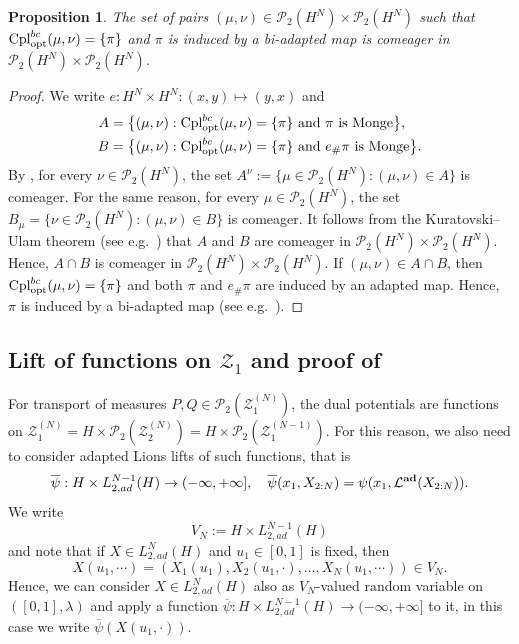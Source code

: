 \documentclass[a4paper]{amsart}
\numberwithin{theorem}{section}
\newtheorem{proposition}[theorem]{Proposition}
\theoremstyle{definition}
\newcommand{\law}{\mathcal{L}}
\newcommand{\cpl}{\textup{Cpl}}
\newcommand{\Pc}{\mathcal P}
\newcommand{\cplopt}{\cpl_{\rm opt}}
\renewcommand{\H}{H}
\newcommand{\Zc}{\mathcal{Z}}
\newcommand{\lawadd}{\law^{\textnormal{\textbf{ad}}}}
\begin{document}
\begin{proposition}\label{prop:biMongeGd_proc}
 The set of pairs $(\mu,\nu) \in \Pc_2(\H^N) \times \Pc_2(\H^N) $  such that  $\cplopt^{bc}(\mu,\nu) = \{\pi\}$ and $\pi$ is induced by a bi-adapted map is  comeager in $\Pc_2(\H^N) \times \Pc_2(\H^N)$.
\end{proposition}
\begin{proof}
 We write $e : \H^N \times \H^N : (x,y) \mapsto (y,x)$ and 
\begin{align*}
    A &= \big\{  (\mu,\nu) : \cplopt^{bc}(\mu,\nu) = \{\pi\}  \text{ and $\pi$ is Monge}  \big\}, \\
    B &= \big\{  (\mu,\nu) : \cplopt^{bc}(\mu,\nu) = \{\pi\}  \text{ and $e_\#\pi$ is Monge}  \big\}.
\end{align*}
 By , for every $\nu \in \Pc_2(\H^N)$, the set $A^\nu := \{ \mu \in \Pc_2(\H^N) : (\mu,\nu) \in A\}$ is comeager.  For the same reason, for every $\mu \in \Pc_2(\H^N)$, the set $B_\mu = \{  \nu \in \Pc_2(\H^N) : (\mu,\nu) \in B \}$ is  comeager. It follows from  the Kuratovski--Ulam theorem (see e.g.\ \cite[Theorem~8.41]{Ke95}) that $A$ and $B$ are comeager in $\Pc_2(\H^N) \times \Pc_2(\H^N)$. Hence, $A \cap B$ is comeager  in $\Pc_2(\H^N) \times \Pc_2(\H^N)$. If $(\mu,\nu) \in A \cap B$, then $\cplopt^{bc}(\mu,\nu) = \{\pi\}$ and both $\pi$ and $e_\#\pi$ are induced by an adapted map. Hence, $\pi$ is induced by a bi-adapted map (see e.g.\ \cite[Lemma A.2]{BePaSc21c}).
\end{proof}


\subsection{Lift of functions on $\Zc_1$ and proof of }
For transport of measures $P,Q \in \Pc_2(\Zc_1^{(N)})$, the dual potentials are functions on $\Zc^{(N)}_1 = \H \times \Pc_2(\Zc^{(N)}_2) = \H \times \Pc_2( \Zc^{(N-1)}_1 ) $. For this reason, we also need to consider adapted Lions lifts of such functions, that is 
\begin{align}\label{eq:LiftZ1}
\overline{\psi} : \H \times L_{2,ad}^{N-1}(\H) \to (-\infty,+\infty], \quad \overline{\psi}(x_1,X_{2:N}) = \psi(x_1,\lawadd(X_{2:N})).
\end{align} 
We write \[
V_N:= \H \times L_{2,ad}^{N-1}(\H)
\]
and note that if $X \in L_{2,ad}^N(\H)$ and $u_1 \in [0,1]$ is fixed, then  
$$
X(u_1,\cdots) = (X_1(u_1),X_2(u_1,\cdot),\dots,X_N(u_1,\cdots)) \in V_N.
$$ 
Hence, we can consider $X \in L_{2,ad}^N(\H)$ also as $V_N$-valued random variable on $([0,1],\lambda)$ and apply a function $\overline{\psi} : \H \times L_{2,ad}^{N-1}(\H) \to (-\infty, +\infty]$ to it, in this case we write $\overline{\psi}(X(u_1,\cdot))$.
\end{document}
